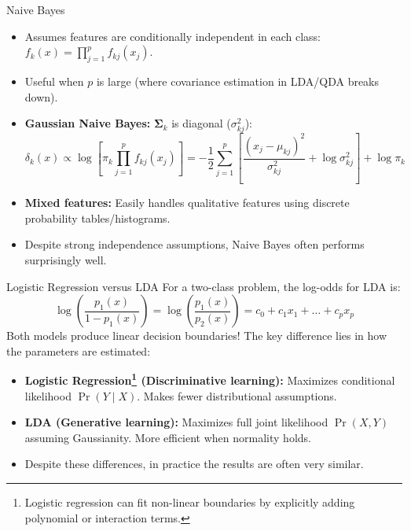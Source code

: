 \documentclass[aspectratio=169, 11pt]{beamer}
\begin{document}
\begin{frame}{Naive Bayes}
  \begin{itemize}
    \item Assumes features are conditionally independent in each class: $f_k(x) = \prod_{j=1}^p f_{kj}(x_j)$.
    \item Useful when $p$ is large (where covariance estimation in LDA/QDA breaks down).
    \item \textbf{Gaussian Naive Bayes:} $\mathbf{\Sigma}_k$ is diagonal ($\sigma_{kj}^2$):
    \[
      \delta_k(x) \propto \log\left[\pi_k \prod_{j=1}^p f_{kj}(x_j)\right] = -\frac{1}{2}\sum_{j=1}^p \left[\frac{(x_j - \mu_{kj})^2}{\sigma_{kj}^2} + \log \sigma_{kj}^2\right] + \log \pi_k
    \]
    \item \textbf{Mixed features:} Easily handles qualitative features using discrete probability tables/histograms.
    \item Despite strong independence assumptions, Naive Bayes often performs surprisingly well.
  \end{itemize}
\end{frame}

\begin{frame}{Logistic Regression versus LDA}
  For a two-class problem, the log-odds for LDA is:
  \[
    \log\left(\frac{p_1(x)}{1 - p_1(x)}\right) = \log\left(\frac{p_1(x)}{p_2(x)}\right) = c_0 + c_1 x_1 + \dots + c_p x_p
  \]
  Both models produce linear decision boundaries! The key difference lies in how the parameters are estimated: \pause
  \begin{itemize}
    \item \textbf{Logistic Regression\footnote{Logistic regression can fit non-linear boundaries by explicitly adding polynomial or interaction terms.} (Discriminative learning):} Maximizes conditional likelihood $\Pr(Y \mid X)$. Makes fewer distributional assumptions.
    \item \textbf{LDA (Generative learning):} Maximizes full joint likelihood $\Pr(X, Y)$ assuming Gaussianity. More efficient when normality holds.
    \item Despite these differences, in practice the results are often very similar.
  \end{itemize}
\end{frame}
\end{document}
